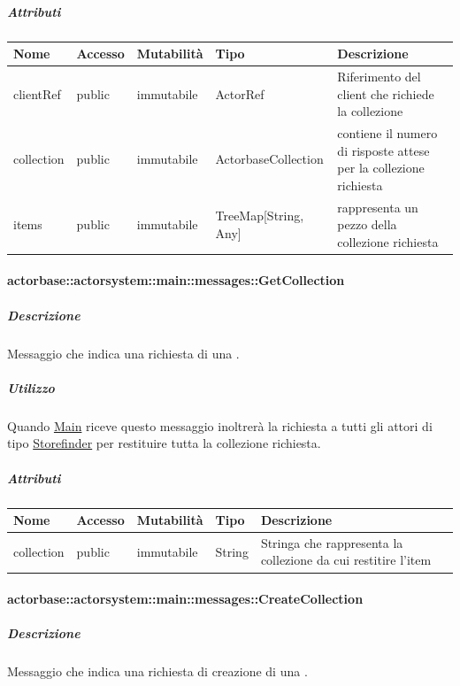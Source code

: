 \documentclass{scalatekids-article}
\begin{document}
\subparagraph{Attributi}
\begin{tabular}{| p{3cm} | p{1.5cm} | p{2cm} | p{2cm} | p{8.5cm} |}
  \hline
  Nome & Accesso & Mutabilità & Tipo & Descrizione\\
  \hline
  clientRef & public & immutabile & ActorRef & Riferimento del client che richiede la collezione\\
  \hline
  collection & public & immutabile & ActorbaseCollection & contiene il numero di risposte attese per la collezione richiesta\\
  \hline
  items & public & immutabile & TreeMap[String, Any] & rappresenta un pezzo della collezione richiesta\\
  \hline
\end{tabular}

\paragraph{actorbase::actorsystem::main::messages::GetCollection}
\label{sec:actorbase::actorsystem::main::messages::GetCollection}

\subparagraph{Descrizione}

Messaggio che indica una richiesta di una .

\subparagraph{Utilizzo}

Quando \hyperref[sec:actorbase::actorsystem::main::Main]{Main}
riceve questo messaggio inoltrerà la richiesta a tutti gli attori di
tipo \hyperref[sec:actorbase::actorsystem::storefinder::Storefinder]{Storefinder} per restituire tutta la collezione richiesta.

\subparagraph{Attributi}
\begin{tabular}{| p{3cm} | p{1.5cm} | p{2cm} | p{2cm} | p{8.5cm} |}
  \hline
  Nome & Accesso & Mutabilità & Tipo & Descrizione\\
  \hline
  collection & public & immutabile & String & Stringa che rappresenta la collezione da cui restitire l'item\\
  \hline
\end{tabular}

\paragraph{actorbase::actorsystem::main::messages::CreateCollection}
\label{sec:actorbase::actorsystem::main::messages::CreateCollection}

\subparagraph{Descrizione}
Messaggio che indica una richiesta di creazione di una .
\end{document}
